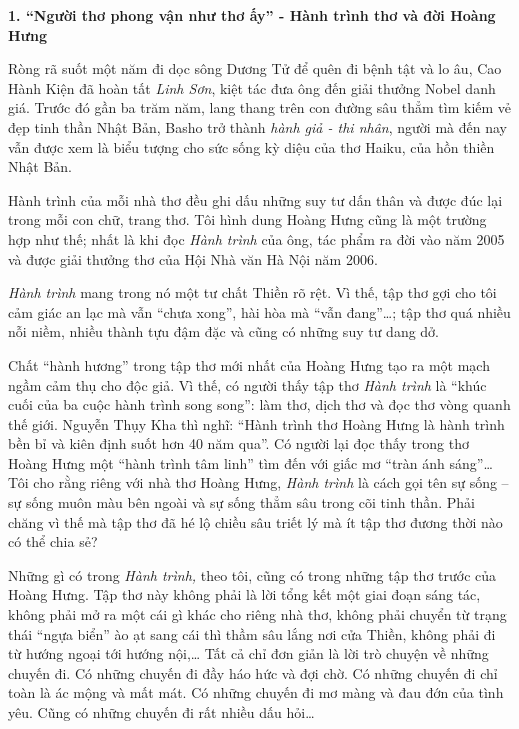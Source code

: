 \documentclass[../main.tex]{subfiles}
\begin{document}
\begin{multicols}{2}

\textbf{1. “Người thơ phong vận như thơ ấy” - Hành trình thơ và đời Hoàng Hưng} 
 
Ròng rã suốt một năm đi dọc sông Dương Tử để quên đi bệnh tật và lo âu, Cao Hành Kiện đã hoàn tất \textit{Linh Sơn}, kiệt tác đưa ông đến giải thưởng Nobel danh giá. Trước đó gần ba trăm năm, lang thang trên con đường sâu thẳm tìm kiếm vẻ đẹp tinh thần Nhật Bản, Basho trở thành \textit{hành giả - thi nhân}, người mà đến nay vẫn được xem là biểu tượng cho sức sống kỳ diệu của thơ Haiku, của hồn thiền Nhật Bản.  
 
Hành trình của mỗi nhà thơ đều ghi dấu những suy tư dấn thân và được đúc lại trong mỗi con chữ, trang thơ. Tôi hình dung Hoàng Hưng cũng là một trường hợp như thế; nhất là khi đọc \textit{Hành trình} của ông, tác phẩm ra đời vào năm 2005 và được giải thưởng thơ của Hội Nhà văn Hà Nội năm 2006.  
 
\textit{Hành trình }mang trong nó một tư chất Thiền rõ rệt. Vì thế, tập thơ gợi cho tôi cảm giác an lạc mà vẫn “chưa xong”, hài hòa mà “vẫn đang”…; tập thơ quá nhiều nỗi niềm, nhiều thành tựu đậm đặc và cũng có những suy tư dang dở.  
 
Chất “hành hương” trong tập thơ mới nhất của Hoàng Hưng tạo ra một mạch ngầm cảm thụ cho độc giả. Vì thế, có người thấy tập thơ \textit{Hành trình} là “khúc cuối của ba cuộc hành trình song song”: làm thơ, dịch thơ và đọc thơ vòng quanh thế giới. Nguyễn Thụy Kha thì nghĩ: “Hành trình thơ Hoàng Hưng là hành trình bền bỉ và kiên định suốt hơn 40 năm qua”. Có người lại đọc thấy trong thơ Hoàng Hưng một “hành trình tâm linh” tìm đến với giấc mơ “tràn ánh sáng”… Tôi cho rằng riêng với nhà thơ Hoàng Hưng, \textit{Hành trình} là cách gọi tên sự sống – sự sống muôn màu bên ngoài và sự sống thẳm sâu trong cõi tinh thần. Phải chăng vì thế mà tập thơ đã hé lộ chiều sâu triết lý mà ít tập thơ đương thời nào có thể chia sẻ?  
 
Những gì có trong \textit{Hành trình, }theo tôi, cũng có trong những tập thơ trước của Hoàng Hưng. Tập thơ này không phải là lời tổng kết một giai đoạn sáng tác, không phải mở ra một cái gì khác cho riêng nhà thơ, không phải chuyển từ trạng thái “ngựa biển” ào ạt sang cái thì thầm sâu lắng nơi cửa Thiền, không phải đi từ hướng ngoại tới hướng nội,… Tất cả chỉ đơn giản là lời trò chuyện về những chuyến đi. Có những chuyến đi đầy háo hức và đợi chờ. Có những chuyến đi chỉ toàn là ác mộng và mất mát. Có những chuyến đi mơ màng và đau đớn của tình yêu. Cũng có những chuyến đi rất nhiều dấu hỏi…  
 

\end{multicols}
\end{document}

